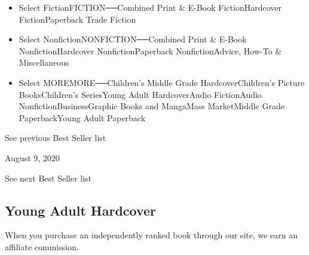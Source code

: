 \begin{itemize}
\tightlist
\item
  Select FictionFICTION──Combined Print \& E-Book FictionHardcover
  FictionPaperback Trade Fiction
\item
  Select NonfictionNONFICTION──Combined Print \& E-Book
  NonfictionHardcover NonfictionPaperback NonfictionAdvice, How-To \&
  Miscellaneous
\item
  Select MOREMORE──Children's Middle Grade HardcoverChildren's Picture
  BooksChildren's SeriesYoung Adult HardcoverAudio FictionAudio
  NonfictionBusinessGraphic Books and MangaMass MarketMiddle Grade
  PaperbackYoung Adult Paperback
\end{itemize}

\href{/books/best-sellers/2020/08/02/young-adult-hardcover/}{}

See previous Best Seller list

August 9, 2020

See next Best Seller list

\hypertarget{young-adult-hardcover}{%
\subsection{Young Adult Hardcover}\label{young-adult-hardcover}}

When you purchase an independently ranked book through our site, we earn
an affiliate commission.

